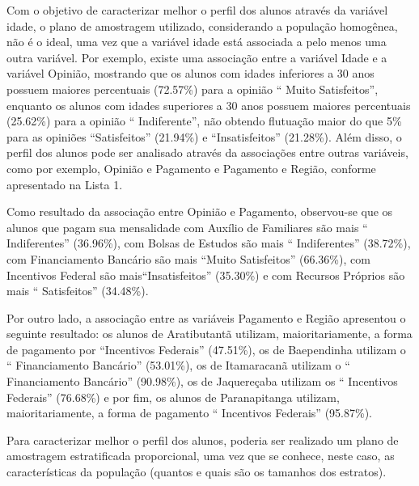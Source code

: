 	Com o objetivo de caracterizar melhor o perfil dos alunos através da
	variável idade, o plano de amostragem utilizado, considerando a
	população homogênea, não é o ideal, uma vez que a variável idade está
	associada a pelo menos uma outra variável. Por exemplo, existe uma
	associação entre a variável Idade e a variável Opinião, mostrando que os
	alunos com idades inferiores a 30 anos possuem maiores percentuais
	(\num{72,57}\%) para a opinião `` Muito Satisfeitos'', enquanto os 
    alunos com idades superiores
	a 30 anos possuem maiores percentuais (\num{25,62}\%) para a opinião
    `` Indiferente'', não obtendo flutuação
	maior do que 5\% para as opiniões ``Satisfeitos'' (\num{21,94}\%) 
    e ``Insatisfeitos'' (\num{21,28}\%). Além disso, o perfil dos
	alunos pode ser analisado através da associações entre outras variáveis,
	como por exemplo, Opinião e Pagamento e Pagamento e Região, conforme
	apresentado na Lista 1. 

	Como resultado da associação entre Opinião e Pagamento, observou-se que
	os alunos que pagam sua mensalidade com Auxílio de Familiares são mais
	`` Indiferentes'' (\num{36,96}\%), com Bolsas
	de Estudos são mais `` Indiferentes''
	(\num{38,72}\%), com Financiamento Bancário são mais ``Muito Satisfeitos''
    (\num{66,36}\%), com Incentivos Federal são mais``Insatisfeitos'' (\num{35,30}\%) e com
	Recursos Próprios são mais ``
	Satisfeitos'' (\num{34,48}\%).

	Por outro lado, a associação entre as variáveis Pagamento e Região
	apresentou o seguinte resultado: os alunos de Aratibutantã utilizam,
	maioritariamente, a forma de pagamento por ``Incentivos Federais''
    (\num{47,51}\%), os de Baependinha utilizam o
	`` Financiamento Bancário'' (\num{53,01}\%), os
	de Itamaracanã utilizam o `` Financiamento Bancário'' 
    (\num{90,98}\%), os de Jaquereçaba utilizam os
	`` Incentivos Federais'' (\num{76,68}\%) e por
	fim, os alunos de Paranapitanga utilizam, maioritariamente, a forma de
	pagamento `` Incentivos Federais'' (\num{95,87}\%). 

	Para caracterizar melhor o perfil dos alunos, poderia ser realizado um
	plano de amostragem estratificada proporcional, uma vez que se conhece,
	neste caso, as características da população (quantos e quais são os
	tamanhos dos estratos). 
